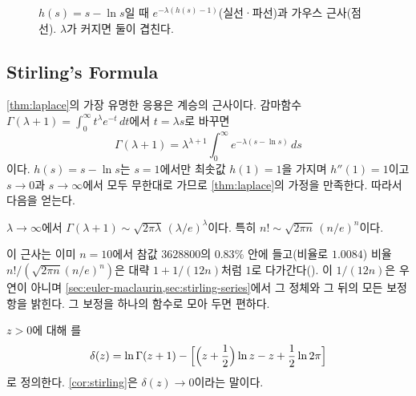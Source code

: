 \begin{figure}[htbp]
\centering
{}
\caption{$h(s)=s-\ln s$일 때 $e^{-\lambda(h(s)-1)}$(실선·파선)과 가우스 근사(점선). $\lambda$가 커지면 둘이 겹친다.}
\label{fig:laplace}
\end{figure}

\subsection{Stirling's Formula}

\cref{thm:laplace}의 가장 유명한 응용은 계승의 근사이다. 감마함수 $\Gamma(\lambda+1)=\int_0^\infty t^\lambda e^{-t}\,dt$에서 $t=\lambda s$로 바꾸면
\[
\Gamma(\lambda+1)=\lambda^{\lambda+1}\int_0^\infty e^{-\lambda(s-\ln s)}\,ds
\]
이다. $h(s)=s-\ln s$는 $s=1$에서만 최솟값 $h(1)=1$을 가지며 $h''(1)=1$이고 $s\to0$과 $s\to\infty$에서 모두 무한대로 가므로 \cref{thm:laplace}의 가정을 만족한다. 따라서 다음을 얻는다.

\begin{corollary}[Stirling]
\label{cor:stirling}
$\lambda\to\infty$에서 $\Gamma(\lambda+1)\sim\sqrt{2\pi\lambda}\,(\lambda/e)^\lambda$이다. 특히 $n!\sim\sqrt{2\pi n}\,(n/e)^n$이다.
\end{corollary}

이 근사는 이미 $n=10$에서 참값 $3628800$의 $0.83\%$ 안에 들고(비율로 $1.0084$) 비율 $n!/(\sqrt{2\pi n}(n/e)^n)$은 대략 $1+1/(12n)$처럼 $1$로 다가간다(). 이 $1/(12n)$은 우연이 아니며 \cref{sec:euler-maclaurin,sec:stirling-series}에서 그 정체와 그 뒤의 모든 보정항을 밝힌다. 그 보정을 하나의 함수로 모아 두면 편하다.

\begin{definition}
\label{def:stirling-error}
$z>0$에 대해 를
\[
\delta(z)=\ln\Gamma(z+1)-\Bigl[\Bigl(z+\frac12\Bigr)\ln z-z+\frac12\ln2\pi\Bigr]
\]
로 정의한다. \cref{cor:stirling}은 $\delta(z)\to0$이라는 말이다.
\end{definition}

